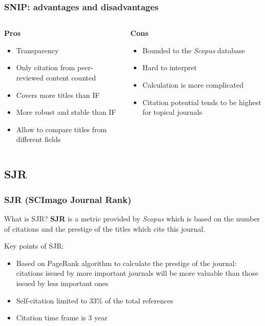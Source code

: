 \documentclass{beamer}
\newcommand{\pros}{\item[{\textcolor[HTML]{3C8031}{\ding{51}}}]}
\newcommand{\cons}{\item[\textcolor{red}{\ding{54}}]}
\newcommand{\sco}{\textit{Scopus} }
\begin{document}
\begin{frame}
    \frametitle{SNIP: advantages and disadvantages}
    \begin{columns}[T]
        \begin{column}{.5\textwidth}
            \centering \textbf{Pros}
            \begin{itemize}[<+->]
                \pros Transparency
                \pros Only citation from peer-reviewed content counted
                \pros Covers more titles than IF
                \pros More robust and stable than IF
                \pros Allow to compare titles from different fields
            \end{itemize}
        \end{column}
        \begin{column}{.5\textwidth}
            \centering \textbf{Cons}
            \begin{itemize}[<+->]
                \cons Bounded to the \sco database
                \cons Hard to interpret
                \cons Calculation is more complicated
                \cons Citation potential tends to be highest for topical journals
            \end{itemize}
        \end{column}
    \end{columns}
\end{frame}

\subsection{SJR}
\begin{frame}
    \frametitle{SJR (SCImago Journal Rank)}
    \begin{block}{What is SJR?}
        \textbf{SJR}\cite{gonzalez2009sjr} is a metric provided by
        \sco which is based on the number of citations and the prestige
        of the titles which cite this journal.
    \end{block}

    Key points of SJR:
    \begin{itemize}
        \item Based on PageRank\cite{page1999pagerank} algorithm to calculate
              the prestige of the journal: citations issued by more important journals will be more valuable than those
              issued by less important ones
        \item Self-citation limited to 33\% of the total references
        \item Citation time frame is 3 year
    \end{itemize}
\end{frame}
\end{document}
